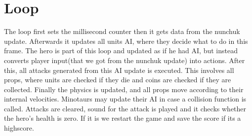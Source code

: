 \section{Loop} %
The loop first sets the millisecond counter then it gets data from the nunchuk update. Afterwards it updates all units AI, where they decide what to do in this frame. The hero is part of this loop and updated as if he had AI, but instead converts player input(that we got from the nunchuk update) into actions. After this, all attacks generated from this AI update is executed. This involves all props, where units are checked if they die and coins are checked if they are collected. Finally the physics is updated, and all props move according to their internal velocities. Minotaurs may update their AI in case a collision function is called.
\newline
Attacks are cleared, sound for the attack is played and it checks whether the hero's health is zero. If it is we restart the game and save the score if its a highscore.


